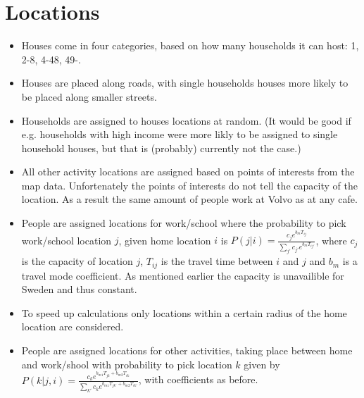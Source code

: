 \documentclass[12pt]{article}
\begin{document}
\section{Locations}
\begin{itemize}
\item
Houses come in four categories, based on how many households it can host: 1, 2-8,
4-48, 49-.
\item
Houses are placed along roads, with single households houses more likely
to be placed along smaller streets.
\item
Households are assigned to houses locations at random. (It would be good if e.g.
households with high income were more likly to be assigned to single household
houses, but that is (probably) currently not the case.)
\item
All other activity locations are assigned based on points of interests from the
map data. Unfortenately the points of interests do not tell the capacity of the
location. As a result the same amount of people work at Volvo as at any cafe.
\item
People are assigned locations for work/school where the probability to pick
work/school location $j$, given home location $i$ is $P(j|i) =
\frac{c_je^{b_mT_{ij}}}{\sum_{j'} c_{j'}e^{b_mT_{ij'}}}$, where $c_j$ is the capacity
of location $j$, $T_{ij}$ is the travel time between $i$ and $j$ and $b_m$ is a
travel mode coefficient. As mentioned earlier the capacity is unavailible for
Sweden and thus constant.
\item
To speed up calculations only locations within a certain radius of the home
location are considered.
\item
People are assigned locations for other activities, taking place between home
and work/shool with probability to pick location $k$ given by $P(k|j,i) =
\frac{c_ke^{b_{m1}T_{jk} + b_{m2}T_{ik}}}{\sum_{k'} c_ke^{b_{m1}T_{jk'} +
b_{m2}T_{ik'}}}$, with coefficients as before.
\end{itemize}
\end{document}
